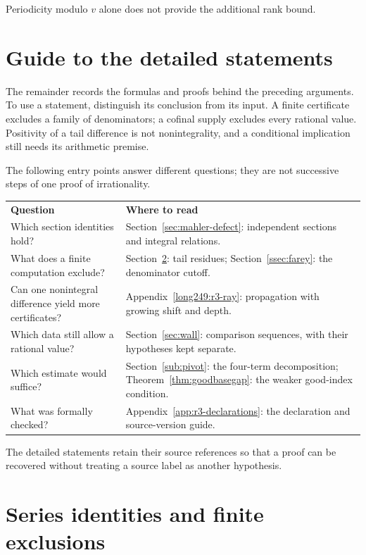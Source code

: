 Periodicity modulo $v$ alone does not provide the additional rank bound.


\section{Guide to the detailed statements}

The remainder records the formulas and proofs behind the preceding
arguments. To use a statement, distinguish its conclusion from its
input. A finite certificate excludes a family of denominators; a
cofinal supply excludes every rational value. Positivity of a tail
difference is not nonintegrality, and a conditional implication still
needs its arithmetic premise.

The following entry points answer different questions; they are not
successive steps of one proof of irrationality.
\begin{center}
\begin{tabular}{@{}p{.39\linewidth}p{.55\linewidth}@{}}
\textbf{Question} & \textbf{Where to read}\\[3pt]
Which section identities hold? &
Section~\ref{sec:mahler-defect}: independent sections and integral relations.\\[3pt]
What does a finite computation exclude? &
Section~\ref{sec:series}: tail residues; Section~\ref{ssec:farey}: the denominator cutoff.\\[3pt]
Can one nonintegral difference yield more certificates? &
Appendix~\ref{long249:r3-ray}: propagation with growing shift and depth.\\[3pt]
Which data still allow a rational value? &
Section~\ref{sec:wall}: comparison sequences, with their hypotheses kept separate.\\[3pt]
Which estimate would suffice? &
Section~\ref{sub:pivot}: the four-term decomposition;
Theorem~\ref{thm:goodbasegap}: the weaker good-index condition.\\[3pt]
What was formally checked? &
Appendix~\ref{app:r3-declarations}: the declaration and source-version guide.
\end{tabular}
\end{center}
The detailed statements retain their source references so that a proof
can be recovered without treating a source label as another hypothesis.
\section{Series identities and finite exclusions}\label{sec:series}

